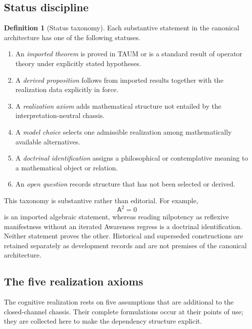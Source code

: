 \documentclass[11pt,reqno]{scrartcl}
\newcommand{\Aodd}{\mathsf A}
\theoremstyle{plain}
\theoremstyle{definition}
\newtheorem{definition}[definition]{Definition}
\theoremstyle{remark}
\begin{document}
\subsection{Status discipline}

\begin{definition}[Status taxonomy]
\label{def:status-taxonomy}
Each substantive statement in the canonical architecture has one of the
following statuses.
\begin{enumerate}[label=(\alph*)]
  \item An \emph{imported theorem} is proved in TAUM or is a standard result
  of operator theory under explicitly stated hypotheses.
  \item A \emph{derived proposition} follows from imported results together
  with the realization data explicitly in force.
  \item A \emph{realization axiom} adds mathematical structure not entailed
  by the interpretation-neutral chassis.
  \item A \emph{model choice} selects one admissible realization among
  mathematically available alternatives.
  \item A \emph{doctrinal identification} assigns a philosophical or
  contemplative meaning to a mathematical object or relation.
  \item An \emph{open question} records structure that has not been selected
  or derived.
\end{enumerate}
\end{definition}

This taxonomy is substantive rather than editorial.  For example,
\begin{equation}
  \Aodd^2=0
\end{equation}
is an imported algebraic statement, whereas reading nilpotency as reflexive
manifestness without an iterated Awareness regress is a doctrinal
identification.  Neither statement proves the other.  Historical and
superseded constructions are retained separately as development records and
are not premises of the canonical architecture.

\subsection{The five realization axioms}
\label{sec:axiomatic-spine}

The cognitive realization rests on five assumptions that are additional to
the closed-channel chassis.  Their complete formulations occur at their
points of use; they are collected here to make the dependency structure
explicit.
\end{document}
